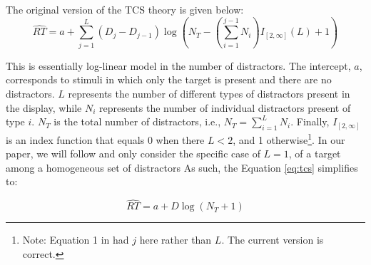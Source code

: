 \documentclass[smallextended, natbib]{svjour3}       %
\begin{document}
The original version of the TCS theory is given below:
\begin{equation}
\hat{RT} = a + \sum_{j=1}^{L}(D_j-D_{j-1})\log{\left( N_T-\left(\sum_{i=1}^{j-1}N_i\right)I_{[2,\infty]}(L)+1\right)}
\label{eq:tcs}
\end{equation}

This is essentially log-linear model in the number of distractors. The intercept, $a$, corresponds to stimuli in which only the target is present and there are no distractors. $L$ represents the number of different types of distractors present in the display, while $N_i$ represents the number of individual distractors present of type $i$. $N_T$ is the total number of distractors, i.e., $N_T = \sum_{i=1}^{L}N_i$. Finally, $I_{[2, \infty]}$ is an index function that equals 0 when there $L<2$, and 1 otherwise\footnote{Note: Equation 1 in \cite{lleras2020target} had $j$ here rather than $L$. The current version is correct.}. In our paper, we will follow \cite{buetti2019predicting} and only consider the specific case of $L=1$, of a target among a homogeneous set of distractors  As such, the Equation \ref{eq:tcs} simplifies to:

\begin{equation}
\hat{RT} = a + D\log(N_T+1)
\label{eq:loglin}
\end{equation}
\end{document}
